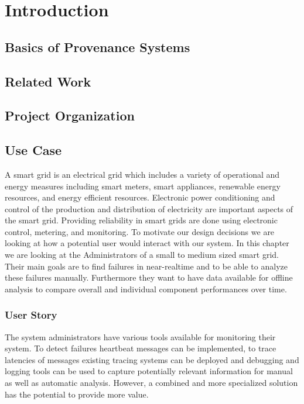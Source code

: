\chapter{Introduction}




\section{Basics of Provenance Systems}




\section{Related Work}




\section{Project Organization}




\section{Use Case}

A smart grid is an electrical grid which includes a variety of operational and energy measures including smart meters, smart appliances, renewable energy resources, and energy efficient resources.
Electronic power conditioning and control of the production and distribution of electricity are important aspects of the smart grid. Providing reliability in smart grids are done using electronic control, metering, and monitoring. 
To motivate our design decisions we are looking at how a potential user would interact with our system. 
In this chapter we are looking at the Administrators of a small to medium sized smart grid. 
Their main goals are to find failures in near-realtime and to be able to analyze these failures manually. Furthermore they want to have data available for offline analysis to compare overall and individual component performances over time. 


\subsection{User Story}

The system administrators have various tools available for monitoring their system. 
To detect failures heartbeat messages can be implemented, to trace latencies of messages existing tracing systems can be deployed and debugging and logging tools can be used to capture potentially relevant information for manual as well as automatic analysis.
However, a combined and more specialized solution has the potential to provide more value.

